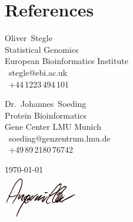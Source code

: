 \documentclass[11pt,a4paper]{moderncv}
\begin{document}
\section{References}
\hspace*{\hintscolumnwidth}%
\hspace*{-0.8cm}%
\begin{minipage}[t]{.5\linewidth}
Oliver~Stegle\\
Statistical Genomics\\
European Bioinformatics Institute\\
\emailsymbol\ stegle@ebi.ac.uk\\
\phonesymbol\ +44\,1223\,494\,101\\
\end{minipage}
\hfill
\begin{minipage}[t]{.5\linewidth}
Dr.\ Johannes~Soeding\\
Protein Bioinformatics\\
Gene Center LMU Munich\\
\emailsymbol\ soeding@genzentrum.lmu.de\\
\phonesymbol\ +49\,89\,2180\,76742\\
\end{minipage}
\hfill

\vspace{3cm}
\parbox{5cm}{\today\\[2ex]
\hspace*{2mm}\includegraphics[width=3.25cm]{signature_bw.jpg}}
\end{document}
